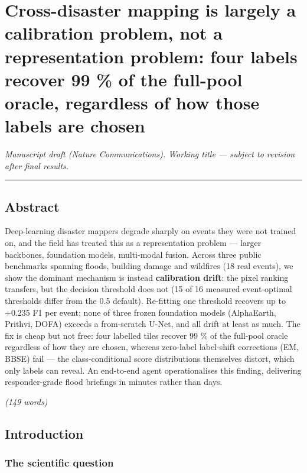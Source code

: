 \section{Cross-disaster mapping is largely a calibration problem, not a representation problem: four labels recover 99 \% of the full-pool oracle, regardless of how those labels are chosen}\label{cross-disaster-mapping-is-largely-a-calibration-problem-not-a-representation-problem-four-labels-recover-99-of-the-full-pool-oracle-regardless-of-how-those-labels-are-chosen}

\emph{Manuscript draft (Nature Communications). Working title --- subject to revision after final results.}

\begin{center}\rule{0.5\linewidth}{0.5pt}\end{center}

\subsection{Abstract}\label{abstract}

Deep-learning disaster mappers degrade sharply on events they were not
trained on, and the field has treated this as a representation problem ---
larger backbones, foundation models, multi-modal fusion. Across three
public benchmarks spanning floods, building damage and wildfires
(18 real events), we show the dominant mechanism is instead
\textbf{calibration drift}: the pixel ranking transfers, but the decision
threshold does not (15 of 16 measured event-optimal thresholds differ
from the 0.5 default). Re-fitting one threshold recovers up to
+0.235 F1 per event; none of three frozen foundation models (AlphaEarth,
Prithvi, DOFA) exceeds a from-scratch U-Net, and all drift at least
as much.
The fix is cheap but not free: four labelled tiles recover 99 \% of the
full-pool oracle regardless of how they are chosen, whereas zero-label
label-shift corrections (EM, BBSE) fail --- the class-conditional score
distributions themselves distort, which only labels can reveal. An
end-to-end agent operationalises this finding, delivering
responder-grade flood briefings in minutes rather than days.

\emph{(149 words)}

\subsection{Introduction}\label{introduction}

\subsubsection{The scientific question}\label{the-scientific-question}

